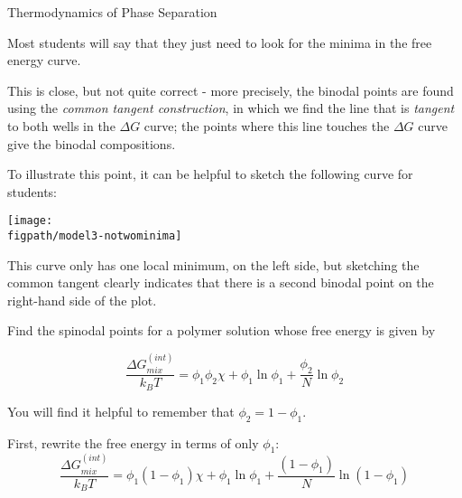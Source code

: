 \begin{activity}{Thermodynamics of Phase Separation}
\begin{ctqs}
		\begin{solution}[2.5in]{}
		
			Most students will say that they just need to look for the minima in the free energy curve.
			
			This is close, but not quite correct - more precisely, the binodal points are found using the \emph{common tangent construction}, in which we find the line that is \emph{tangent} to both wells in the $\Delta G$ curve; the points where this line touches the $\Delta G$ curve give the binodal compositions.
			
			To illustrate this point, it can be helpful to sketch the following curve for students:
			
\centerline{\texttt{[image: \\figpath/model3-notwominima]}}			
			
			This curve only has one local minimum, on the left side, but sketching the common tangent clearly indicates that there is a second binodal point on the right-hand side of the plot.
		
		
		\end{solution}
		
\end{ctqs}



\begin{exercises}
		
		\exercise Find the spinodal points for a polymer solution whose free energy is given by
		
			\begin{equation*}
				\frac{\Delta G_{mix}^{(int)}}{k_B T} = \phi_1\phi_2\chi + \phi_1\ln\phi_1 + \frac{\phi_2}{N}\ln\phi_2
			\end{equation*}
			
			You will find it helpful to remember that $\phi_2 = 1-\phi_1$.
		
			\begin{solution}{}
				First, rewrite the free energy in terms of only $\phi_1$:
				\begin{equation*}
					\frac{\Delta G_{mix}^{(int)}}{k_B T} = \phi_1(1-\phi_1)\chi + \phi_1\ln\phi_1 + \frac{(1-\phi_1)}{N}\ln(1-\phi_1)
				\end{equation*}
			

\end{solution}
\end{exercises}
\end{activity}
